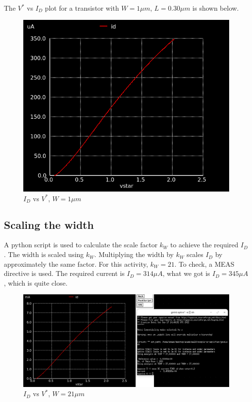 \documentclass[conference]{IEEEtran}
\begin{document}
The $V^*$ vs $I_D$ plot for a transistor with $W=1\mu m$, $L=0.30 \mu m$ is shown below. 
\begin{figure}[H]
	\centering 
	\includegraphics[scale=0.38]{vstar-id.png}
	\caption{$I_D$ vs $V^*$, $W=1\mu m$}
	\label{vstar-id}
\end{figure}
\subsection{Scaling the width}
A python script is used to calculate the scale factor $k_W$ to achieve the required $I_D$. The width is scaled using $k_W$. Multiplying the width by $k_W$ scales $I_D$ by approximately the same factor. For this activity, $k_W=21$.
To check, a MEAS directive is used. The required current is $I_D=314\mu A$, what we got is $I_D=345\mu A$, which is quite close. 
\begin{figure}[H]
	\centering 
	\includegraphics[width=\columnwidth]{vstar-scale-id.png}
	\caption{$I_D$ vs $V^*$, $W=21\mu m$}
	\label{vstar-scale-id}
\end{figure}
\end{document}
